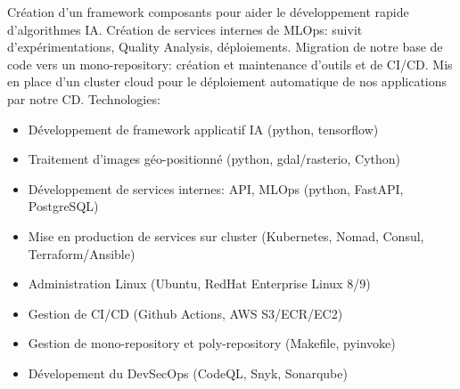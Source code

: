 {\begin{itemize}
  \end{itemize}
  \else
  Création d'un framework composants pour aider le développement rapide d'algorithmes IA.\newline{}
  Création de services internes de MLOps: suivit d’expérimentations, Quality Analysis, déploiements.\newline{}
  Migration de notre base de code vers un mono-repository: création et maintenance d'outils et de CI/CD.\newline{}
  Mis en place d'un cluster cloud pour le déploiement automatique de nos applications par notre CD.\newline{}
  Technologies:
  \begin{itemize}
    \item Développement de framework applicatif IA (python, tensorflow)
    \item Traitement d'images géo-positionné (python, gdal/rasterio, Cython)
    \item Développement de services internes: API, MLOps (python, FastAPI, PostgreSQL) 
    \item Mise en production de services sur cluster (Kubernetes, Nomad, Consul, Terraform/Ansible)
    \item Administration Linux (Ubuntu, RedHat Enterprise Linux 8/9)
    \item Gestion de CI/CD (Github Actions, AWS S3/ECR/EC2)
    \item Gestion de mono-repository et poly-repository (Makefile, pyinvoke)
    \item Dévelopement du DevSecOps (CodeQL, Snyk, Sonarqube)
  \end{itemize}
  \fi
}



